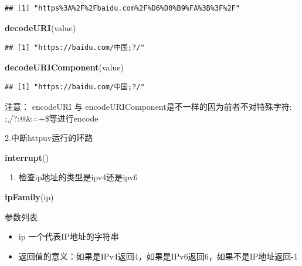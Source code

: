 \documentclass[]{book}
\newenvironment{Shaded}{\begin{snugshade}}{\end{snugshade}}
\newcommand{\KeywordTok}[1]{\textcolor[rgb]{0.13,0.29,0.53}{\textbf{#1}}}
\newcommand{\NormalTok}[1]{#1}
\providecommand{\tightlist}{%
  \setlength{\itemsep}{0pt}\setlength{\parskip}{0pt}}
\begin{document}
\begin{verbatim}
## [1] "https%3A%2F%2Fbaidu.com%2F%D6%D0%B9%FA%3B%3F%2F"
\end{verbatim}

\begin{Shaded}
\begin{Highlighting}[]
\KeywordTok{decodeURI}\NormalTok{(value)}
\end{Highlighting}
\end{Shaded}

\begin{verbatim}
## [1] "https://baidu.com/中国;?/"
\end{verbatim}

\begin{Shaded}
\begin{Highlighting}[]
\KeywordTok{decodeURIComponent}\NormalTok{(value)}
\end{Highlighting}
\end{Shaded}

\begin{verbatim}
## [1] "https://baidu.com/中国;?/"
\end{verbatim}

注意： encodeURI 与 encodeURIComponent是不一样的因为前者不对特殊字符:
;,/?:@\&=+\$等进行encode

2.中断httpuv运行的环路

\begin{Shaded}
\begin{Highlighting}[]
\KeywordTok{interrupt}\NormalTok{()}
\end{Highlighting}
\end{Shaded}

\begin{enumerate}
\def\labelenumi{\arabic{enumi}.}
\setcounter{enumi}{2}
\tightlist
\item
  检查ip地址的类型是ipv4还是ipv6
\end{enumerate}

\begin{Shaded}
\begin{Highlighting}[]
\KeywordTok{ipFamily}\NormalTok{(ip)}
\end{Highlighting}
\end{Shaded}

参数列表

\begin{itemize}
\item
  ip 一个代表IP地址的字符串
\item
  返回值的意义：如果是IPv4返回4，如果是IPv6返回6，如果不是IP地址返回-1
\end{itemize}
\end{document}
